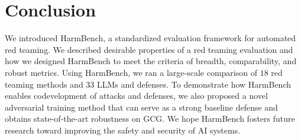 \section{Conclusion}
We introduced HarmBench, a standardized evaluation framework for automated red teaming. We described desirable properties of a red teaming evaluation and how we designed HarmBench to meet the criteria of breadth, comparability, and robust metrics. Using HarmBench, we ran a large-scale comparison of $18$ red teaming methods and $33$ LLMs and defenses. To demonstrate how HarmBench enables codevelopment of attacks and defenses, we also proposed a novel adversarial training method that can serve as a strong baseline defense and obtains state-of-the-art robustness on GCG. We hope HarmBench fosters future research toward improving the safety and security of AI systems.
